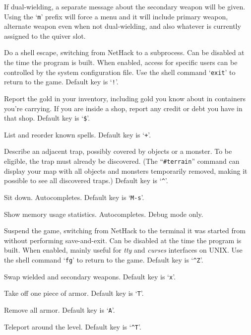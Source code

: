\documentclass[titlepage]{article}
\begin{document}
\begin{description}[font=\mdseries\ttfamily]
If dual-wielding, a separate message about the secondary weapon will be
given.
Using the `\texttt{m}' prefix will force a menu and it will include
primary weapon, alternate weapon even when not dual-wielding, and also
whatever is currently assigned to the quiver slot.
\item[\#shell]
Do a shell escape, switching from NetHack to a subprocess.
Can be disabled at the time the program is built.
When enabled, access for specific users can be controlled by the system
configuration file.
Use the shell command `\texttt{exit}' to return to the game.
Default key is `\texttt{!}'.
\item[\#showgold]
Report the gold in your inventory, including gold you know about in
containers you're carrying.  If you are inside a shop, report any credit
or debt you have in that shop.
Default key is `\texttt{\$}'.
\item[\#showspells]
List and reorder known spells.
Default key is `\texttt{+}'.
\item[\#showtrap]
Describe an adjacent trap, possibly covered by objects or a monster.
To be eligible, the trap must already be discovered.
(The ``\texttt{\#terrain}'' command can display your map with all objects and
monsters temporarily removed, making it possible to see all discovered
traps.)
Default key is `\texttt{\textasciicircum }'.
\item[\#sit]
Sit down. Autocompletes. Default key is `\texttt{M-s}'.
\item[\#stats]
Show memory usage statistics.
Autocompletes.
Debug mode only.
\item[\#suspend]
Suspend the game, switching from NetHack to the terminal it was started
from without performing save-and-exit.
Can be disabled at the time the program is built.
When enabled, mainly useful for \textit{tty} and \textit{curses} interfaces on
UNIX.
Use the shell command `\texttt{fg}' to return to the game.
Default key is `\texttt{\textasciicircum Z}'.
\item[\#swap]
Swap wielded and secondary weapons. Default key is `\texttt{x}'.
\item[\#takeoff]
Take off one piece of armor. Default key is `\texttt{T}'.
\item[\#takeoffall]
Remove all armor. Default key is `\texttt{A}'.
\item[\#teleport]
Teleport around the level. Default key is `\texttt{\textasciicircum T}'.
\item[\#terrain]

\end{description}
\end{document}
